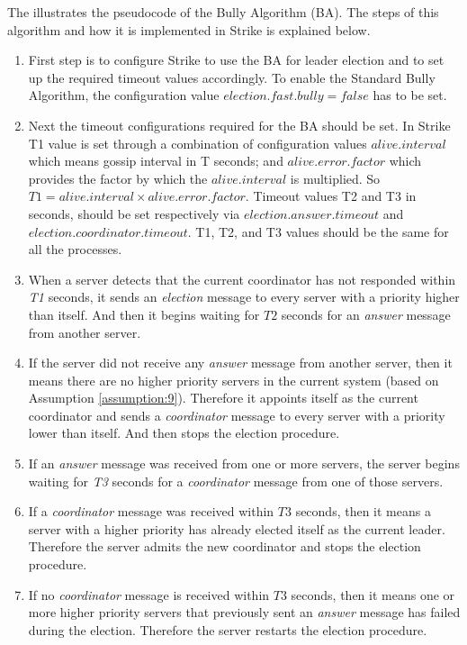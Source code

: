 \documentclass[dareport.tex]{subfiles}
\begin{document}
The  illustrates the pseudocode of the Bully Algorithm (BA). The steps of this algorithm and how it is implemented in Strike is explained below.
\begin{enumerate}[leftmargin=*]
	\item First step is to configure Strike to use the BA for leader election and to set up the required timeout values accordingly. To enable the Standard Bully Algorithm, the configuration value $election.fast.bully=false$ has to be set.
	\item Next the timeout configurations required for the BA should be set. In Strike T1 value is set through a combination of configuration values $ alive.interval $ which means gossip interval in T seconds; and $ alive.error.factor $ which provides the factor by which the $ alive.interval $ is multiplied. So $ T1= alive.interval \times alive.error.factor $. Timeout values T2 and T3 in seconds, should be set respectively via $ election.answer.timeout $ and $ election.coordinator.timeout $. T1, T2, and T3 values should be the same for all the processes.
	\item When a server detects that the current coordinator has not responded within \emph{T1} seconds, it sends an \emph{election} message to every server with a priority higher than itself. And then it begins waiting for $ T2 $ seconds for an \emph{answer} message from another server.
	\item If the server did not receive any \emph{answer} message from another server, then it means there are no higher priority servers in the current system (based on Assumption \ref{assumption:9}). Therefore it appoints itself as the current coordinator and sends a \emph{coordinator} message to every server with a priority lower than itself. And then stops the election procedure.
	\item If an \emph{answer} message was received from one or more servers, the server begins waiting for \emph{T3} seconds for a \emph{coordinator} message from one of those servers.
	\item If a \emph{coordinator} message was received within $T3$ seconds, then it means a server with a higher priority has already elected itself as the current leader. Therefore the server admits the new coordinator and stops the election procedure.
	\item If no \emph{coordinator} message is received within $ T3 $ seconds, then it means one or more higher priority servers that previously sent an \emph{answer} message has failed during the election. Therefore the server restarts the election procedure.

\end{enumerate}
\end{document}
